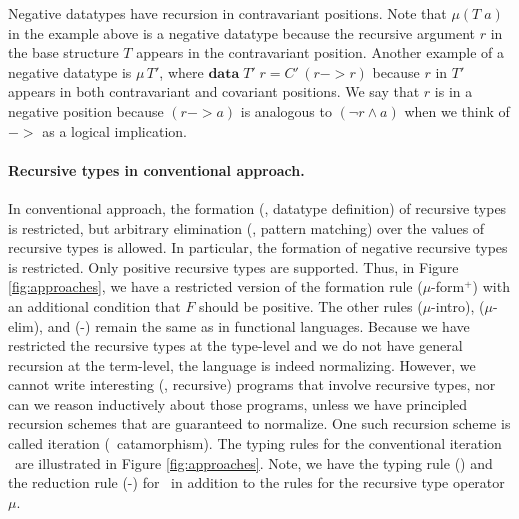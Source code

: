 Negative datatypes have recursion in contravariant positions.
Note that $\mu(T\;a)$ in the example above is a negative datatype
because the recursive argument $r$ in the base structure $T$ appears
in the contravariant position. Another example of a negative datatype is
$\mu\,T'$, where $\textbf{data}\;T'\;r = C'\,(r -> r)$ because $r$ in $T'$
appears in both contravariant and covariant positions.
We say that $r$ is in a negative position because $(r -> a)$ is analogous to
$(\neg r \land a)$ when we think of $->$ as a logical implication.


\paragraph{Recursive types in conventional approach.}
In conventional approach, the formation (\ie, datatype definition) of
recursive types is restricted, but arbitrary elimination (\ie, pattern matching)
over the values of recursive types is allowed. In particular, the formation of
negative recursive types is restricted. Only positive recursive types are
supported. Thus, in Figure \ref{fig:approaches}, we have a restricted version of
the formation rule {\small($\mu$-form$^{+}$)} with an additional condition that
$F$ should be positive. The other rules {\small($\mu$-intro)},
{\small($\mu$-elim)}, and {\small(\unIn-\In)} remain the same as in
functional languages. Because we have restricted the recursive types
at the type-level and we do not have general recursion at the term-level,
the language is indeed normalizing. However, we cannot write
interesting (\ie, recursive) programs that involve recursive types, nor
can we reason inductively about those programs, unless we have principled recursion
schemes that are guaranteed to normalize. One such recursion scheme is called
iteration (\aka\ catamorphism). The typing rules for the conventional iteration
\It\ are illustrated in Figure \ref{fig:approaches}. Note, we have the typing
rule {\small(\It)} and the reduction rule {\small(\It-\In)} for \It\,
in addition to the rules for the recursive type operator $\mu$.

